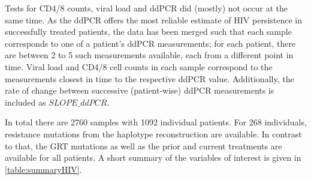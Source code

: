 Tests for CD4/8 counts, viral load and ddPCR did (mostly) not occur at the same time.
As the ddPCR offers the most reliable estimate of HIV persistence in successfully treated patients,
the data has been merged such that each sample corresponds to one of a patient's ddPCR measurements;
for each patient, there are between 2 to 5 such measurements available, each from a different point in time.
Viral load and CD4/8 cell counts in each sample correspond to the measurements closest in time to the respective ddPCR value.
Additionally, the rate of change between successive (patient-wise) ddPCR measurements is included as $SLOPE\_ddPCR$.

In total there are 2760 samples with 1092 individual patients.
For 268 individuals, resistance mutations from the haplotype reconstruction are available.
In contrast to that, the GRT mutations as well as the prior and current treatments are available for all patients.
A short summary of the variables of interest is given in \autoref{table:summaryHIV}.
\begin{table}[H]
	\centering
	\caption{Summary of the (non-boolean ) variables in the data set.}
	\label{table:summaryHIV}
	
\end{table}
